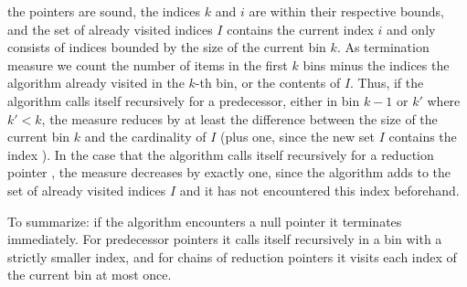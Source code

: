 \begin{isabellebody}
\begin{isamarkuptext}
the pointers are sound, the indices $k$ and $i$ are within their respective bounds, and the set of already
visited indices $I$ contains the current index $i$ and only consists of indices bounded by the size of the current bin $k$.
As termination measure we count the number of items in the first $k$ bins minus the indices the algorithm
already visited in the $k$-th bin, or the contents of $I$. Thus, if the algorithm calls itself recursively
for a predecessor, either in bin $k-1$ or $k'$ where $k' < k$, the measure reduces by at least the difference
between the size of the current bin $k$ and the cardinality of $I$ (plus one, since the new set $I$ contains the index ).
In the case that the algorithm calls itself recursively for a reduction pointer , the measure decreases by exactly
one, since the algorithm adds  to the set of already visited indices $I$ and it has not encountered this index beforehand.

To summarize: if the algorithm encounters a null pointer it terminates immediately.
For predecessor pointers it calls itself recursively in a bin with a strictly smaller index, and for chains of reduction
pointers it visits each index of the current bin at most once.


\end{isamarkuptext}
\end{isabellebody}
